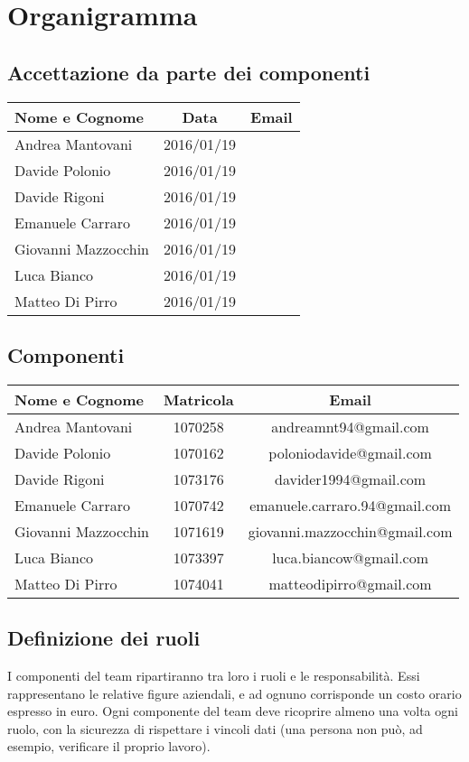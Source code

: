 \section*{Organigramma} %
\subsection*{Accettazione da parte dei componenti}
\begin{center}
  \begin{tabular}{ l | c | c }
    \hline
    \textbf{Nome e Cognome} & \textbf{Data} & \textbf{Email} \\
    \hline
    Andrea Mantovani & 2016/01/19 &  \\ \hline
    Davide Polonio & 2016/01/19 &  \\ \hline
    Davide Rigoni & 2016/01/19 &  \\ \hline
    Emanuele Carraro & 2016/01/19 &  \\ \hline
    Giovanni Mazzocchin & 2016/01/19 &  \\ \hline
    Luca Bianco & 2016/01/19 &  \\ \hline
    Matteo Di Pirro & 2016/01/19 &  \\
    \hline
  \end{tabular}
\end{center}


\subsection*{Componenti}
\begin{center}
  \begin{tabular}{ l | c | c }
    \hline
    \textbf{Nome e Cognome} & \textbf{Matricola} & \textbf{Email} \\
    \hline
    Andrea Mantovani & 1070258 & andreamnt94@gmail.com \\ \hline
    Davide Polonio & 1070162 & poloniodavide@gmail.com \\ \hline
    Davide Rigoni & 1073176 & davider1994@gmail.com \\ \hline
    Emanuele Carraro & 1070742 & emanuele.carraro.94@gmail.com \\ \hline
    Giovanni Mazzocchin & 1071619 & giovanni.mazzocchin@gmail.com \\ \hline
    Luca Bianco & 1073397 & luca.biancow@gmail.com \\ \hline
    Matteo Di Pirro & 1074041 & matteodipirro@gmail.com \\
    \hline
  \end{tabular}
\end{center}



\subsection*{Definizione dei ruoli}
I componenti del team ripartiranno tra loro i ruoli e le responsabilità. Essi rappresentano le relative figure aziendali, e ad ognuno corrisponde un costo orario espresso in euro.
Ogni componente del team deve ricoprire almeno una volta ogni ruolo, con la sicurezza di rispettare i vincoli dati (una persona non può, ad esempio, verificare il proprio lavoro).
